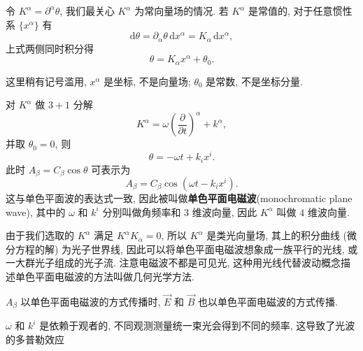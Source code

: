 令 $K^\alpha=\partial^\alpha\theta$, 我们最关心 $K^\alpha$ 为常向量场的情况. 若 $K^\alpha$ 是常值的, 对于任意惯性系 $\{x^\alpha\}$ 有
\[ \mathrm{d}\theta=\partial_\alpha\theta\,\mathrm{d}x^\alpha=K_\alpha\,\mathrm{d}x^\alpha, \]
上式两侧同时积分得
\[ \theta=K_\alpha x^\alpha+\theta_0. \]
\begin{remark}    
    这里稍有记号滥用, $x^\alpha$ 是坐标, 不是向量场; $\theta_0$ 是常数, 不是坐标分量.
\end{remark}
对 $K^\alpha$ 做 $3+1$ 分解
\[K^\alpha=\omega\left( \frac{\partial}{\partial t} \right)^\alpha+k^\alpha, \]
并取 $\theta_0=0$, 则
\[\theta=-\omega t+k_ix^i.\]
此时 $A_\beta=C_\beta\cos\theta$ 可表示为
\[ A_\beta=C_\beta\cos(\omega t-k_ix^i). \]
这与单色平面波的表达式一致, 因此被叫做\textbf{单色平面电磁波}(monochromatic plane wave), 其中的 $\omega$ 和 $k^i$ 分别叫做角频率和 $3$ 维波向量, 因此 $K^\alpha$ 叫做 $4$ 维波向量.

由于我们选取的 $K^\alpha$ 满足 $K^\alpha K_\alpha=0$, 所以 $K^\alpha$ 是类光向量场, 其上的积分曲线 (微分方程的解) 为光子世界线, 因此可以将单色平面电磁波想象成一族平行的光线, 或一大群光子组成的光子流. 注意电磁波不都是可见光, 这种用光线代替波动概念描述单色平面电磁波的方法叫做几何光学方法.

\begin{remark}
    $A_\beta$ 以单色平面电磁波的方式传播时, $\vec{E}$ 和 $\vec{B}$ 也以单色平面电磁波的方式传播\cite[182页, 选读 6-6-3]{梁灿彬2000微分几何入门与广义相对论}.
\end{remark}

\begin{remark}
    $\omega$ 和 $k^i$ 是依赖于观者的, 不同观测测量统一束光会得到不同的频率, 这导致了光波的多普勒效应\cite[184--185页]{梁灿彬2000微分几何入门与广义相对论}
\end{remark}